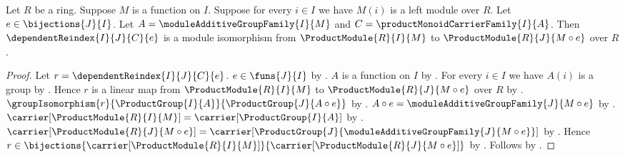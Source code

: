 \begin{theorem}\label{bijective_product_module_reindex_isomorphism}
    Let $R$ be a ring.
    Suppose $M$ is a function on $I$.
    Suppose for every $i\in I$ we have $M(i)$ is a left module over $R$.
    Let $e\in\bijections{J}{I}$.
    Let $A=\moduleAdditiveGroupFamily{I}{M}$ and
        $C=\productMonoidCarrierFamily{I}{A}$.
    Then $\dependentReindex{I}{J}{C}{e}$ is a module isomorphism from
        $\ProductModule{R}{I}{M}$ to
        $\ProductModule{R}{J}{M\circ e}$ over $R$.
\end{theorem}
\begin{proof}
    Let $r=\dependentReindex{I}{J}{C}{e}$.
    $e\in\funs{J}{I}$ by .
    $A$ is a function on $I$ by
        .
    For every $i\in I$ we have $A(i)$ is a group by
        .
    Hence $r$ is a linear map from $\ProductModule{R}{I}{M}$ to
        $\ProductModule{R}{J}{M\circ e}$ over $R$ by
        .
    $\groupIsomorphism{r}{\ProductGroup{I}{A}}{
        \ProductGroup{J}{A\circ e}}$ by
        .
    $A\circ e=\moduleAdditiveGroupFamily{J}{M\circ e}$ by
        .
    $\carrier[\ProductModule{R}{I}{M}]=\carrier[\ProductGroup{I}{A}]$
        by .
    $\carrier[\ProductModule{R}{J}{M\circ e}]
        =\carrier[\ProductGroup{J}{\moduleAdditiveGroupFamily{J}{M\circ e}}]$
        by .
    Hence $r\in\bijections{\carrier[\ProductModule{R}{I}{M}]}{
        \carrier[\ProductModule{R}{J}{M\circ e}]}$ by
        .
    Follows by .
\end{proof}
